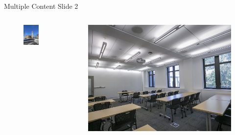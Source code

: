 \documentclass[usenames,dvipsnames]{beamer}
\begin{document}
\begin{frame}{Multiple Content Slide 2}
    \begin{columns}
        \begin{column}{0.3\textwidth}
            \begin{figure}
                \raggedright
                \includegraphics[width=\linewidth]{Images/McGraw_Tower_in_January.JPG}
            \end{figure} 
       \end{column} 
       \begin{column}{0.3\textwidth}
            \begin{figure}
                \raggedright
                \includegraphics[width=\linewidth]{Images/carousel-04.jpg}

\end{figure}
\end{column}
\end{columns}
\end{frame}
\end{document}
